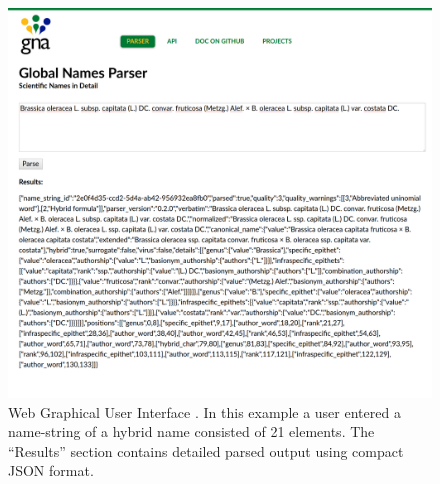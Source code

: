 \documentclass{bmcart}
\begin{document}
\begin{figure}[htbp]
  \begin{center}
    \caption{Web Graphical User Interface \cite{gnparser-web}. In this example
a user entered a name-string of a hybrid name consisted of 21 elements.
The ``Results'' section contains detailed parsed output using compact JSON
format.}\label{figure:webgui}
    \vspace{5mm}
    \includegraphics[scale=0.175]{images/web_gui.png}
  \end{center}
\end{figure}

\end{document}
